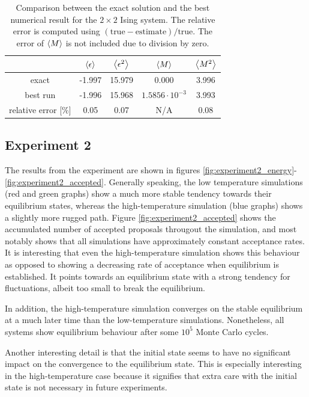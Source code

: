 \documentclass[nofootinbib,reprint,english]{revtex4-1}
\begin{document}
\begin{table}[hb]
\centering
\begin{tabular}{|c|c|c|c|c|}
\hline\rule{0pt}{0.3cm}
& \(\expval{\epsilon}\) & \(\expval{\epsilon^2}\) & \(\expval{M}\) & \(\expval{M^2}\) \\\hline
exact & -1.997 & 15.979 & 0.000 & 3.996 \\\hline\rule{0pt}{0.4cm}
best run & -1.996 & 15.968 & \(1.5856\cdot10^{-3}\) & 3.993 \\\hline\rule{0pt}{0.4cm}
relative error [\%] & 0.05 & 0.07 & N/A & 0.08 \\\hline
\end{tabular}
\caption{Comparison between the exact solution and the best numerical result for the \(2\times2\) Ising system. The relative error is computed using \((\text{true}-\text{estimate})/\text{true}\). The error of \(\expval{M}\) is not included due to division by zero.}\label{tab:results_experiment1}
\end{table}
\newpage
\subsection{Experiment 2}
The results from the experiment are shown in figures \ref{fig:experiment2_energy}-\ref{fig:experiment2_accepted}. Generally speaking, the low temperature simulations (red and green graphs) show a much more stable tendency towards their equilibrium states, whereas the high-temperature simulation (blue graphs) shows a slightly more rugged path. Figure \ref{fig:experiment2_accepted} shows the accumulated number of accepted proposals througout the simulation, and most notably shows that all simulations have approximately constant acceptance rates. It is interesting that even the high-temperature simulation shows this behaviour as opposed to showing a decreasing rate of acceptance when equilibrium is established. It points towards an equilibrium state with a strong tendency for fluctuations, albeit too small to break the equilibrium.

In addition, the high-temperature simulation converges on the stable equilibrium at a much later time than the low-temperature simulations. Nonetheless, all systems show equilibrium behaviour after some \(10^5\) Monte Carlo cycles.

Another interesting detail is that the initial state seems to have no significant impact on the convergence to the equilibrium state. This is especially interesting in the high-temperature case because it signifies that extra care with the initial state is not necessary in future experiments.
\end{document}
